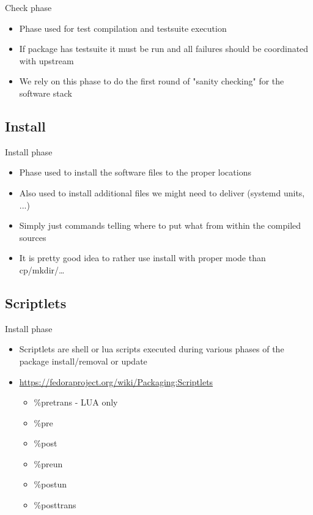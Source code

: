 \documentclass{beamer}
\begin{document}
\begin{frame}[t]{Check phase}
	\begin{itemize}
	\item Phase used for test compilation and testsuite execution
    \item If package has testsuite it must be run and all failures should be coordinated with upstream
    \item We rely on this phase to do the first round of "sanity checking" for the software stack
	\end{itemize}
\end{frame}

\subsection{Install}

\begin{frame}[t]{Install phase}
	\begin{itemize}
	\item Phase used to install the software files to the proper locations
    \item Also used to install additional files we might need to deliver (systemd units, ...)
    \item Simply just commands telling where to put what from within the compiled sources
    \item It is pretty good idea to rather use install with proper mode than cp/mkdir/\ldots
	\end{itemize}
\end{frame}

\subsection{Scriptlets}

\begin{frame}[t]{Install phase}
	\begin{itemize}
    \item Scriptlets are shell or lua scripts executed during various phases of the package install/removal or update
    \item \url{https://fedoraproject.org/wiki/Packaging:Scriptlets}
        \begin{itemize}
        \item \%pretrans - LUA only
        \item \%pre
        \item \%post
        \item \%preun
        \item \%postun
        \item \%posttrans
        \end{itemize}
	\end{itemize}
\end{frame}
\end{document}
